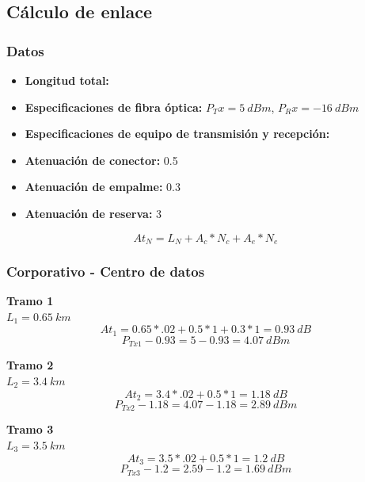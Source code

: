 \documentclass[12pt,letterpaper]{article}
\begin{document}
\newpage
\subsection{Cálculo de enlace}
\subsubsection{Datos}
\begin{itemize}
    \item \textbf{Longitud total: }
    \item \textbf{Especificaciones de fibra óptica: } $P_Tx=5 \ dBm$, $P_Rx=-16 \ dBm$
    \item \textbf{Especificaciones de equipo de transmisión y recepción: }
    \item \textbf{Atenuación de conector: }0.5
    \item \textbf{Atenuación de empalme: }0.3
    \item \textbf{Atenuación de reserva: }3
\end{itemize}

\begin{equation}
    At_N=L_N+A_c*N_c+A_e*N_e
\end{equation}

\subsubsection{Corporativo - Centro de datos}
\textbf{Tramo 1} \\
$L_1=0.65 \ km$
\\
\begin{equation}
    At_1=0.65*.02+0.5*1+0.3*1=0.93 \ dB
\end{equation}
\begin{equation}
    P_{Tx1}-0.93=5-0.93=4.07 \ dBm
\end{equation}

\textbf{Tramo 2} \\
$L_2=3.4 \ km$
\\
\begin{equation}
    At_2=3.4*.02+0.5*1=1.18 \ dB
\end{equation}
\begin{equation}
    P_{Tx2}-1.18=4.07-1.18=2.89 \ dBm
\end{equation}

\textbf{Tramo 3} \\
$L_3=3.5 \ km$
\\ 
\begin{equation}
    At_3=3.5*.02+0.5*1=1.2 \ dB
\end{equation}
\begin{equation}
    P_{Tx3}-1.2=2.59-1.2=1.69 \ dBm
\end{equation}
\end{document}
